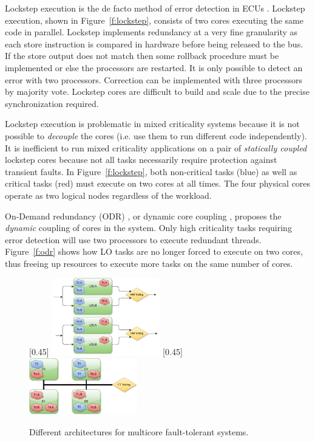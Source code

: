 \documentclass[conference]{IEEEtran}
\begin{document}
	Lockstep execution \cite{baleani2003fault} is the de facto method of error detection in ECUs \cite{infineon2014aurix,freescale2014qorivva,renesas2016lockstep}. Lockstep execution, shown in Figure~\ref{f:lockstep}, consists of two cores executing the same code in parallel. 
	Lockstep implements redundancy at a very fine granularity as each store instruction is compared in hardware before being released to the bus. 
	If the store output does not match then some rollback procedure must be implemented or else the processors are restarted. 
	It is only possible to detect an error with two processors. 
	Correction can be implemented with three processors by majority vote. 
	Lockstep cores are difficult to build and scale due to the precise synchronization required.

	Lockstep execution is problematic in mixed criticality systems because it is not possible to \emph{decouple} the cores (i.e. use them to run different code independently). 
	It is inefficient to run mixed criticality applications on a pair of \emph{statically coupled} lockstep cores because not all tasks necessarily require protection against transient faults. 
	In Figure~\ref{f:lockstep}, both non-critical tasks (blue) as well as critical tasks (red) must execute on two cores at all times. 	
	The four physical cores operate as two logical nodes regardless of the workload.

	On-Demand redundancy (ODR) \cite{Meyer:CASES11,fu2013demand}, or dynamic core coupling \cite{lafrieda2007utilizing}, proposes the \emph{dynamic} coupling of cores in the system. 
	Only high criticality tasks requiring error detection will use two processors to execute redundant threads. 
	Figure~\ref{f:odr} shows how LO tasks are no longer forced to execute on two cores, thus freeing up resources to execute more tasks on the same number of cores.


\begin{figure}
\captionsetup[subfigure]{singlelinecheck=false}
\centering
{}[0.45\textwidth]
{
    \includegraphics[width=0.42\textwidth]{lockstep.pdf}
}%
\hfill
{}[0.45\textwidth]
{
    \includegraphics[width=0.42\textwidth]{odr.pdf}
}%
\caption{Different architectures for multicore fault-tolerant systems.}
\label{f:ft-arch}
\end{figure}
\end{document}
